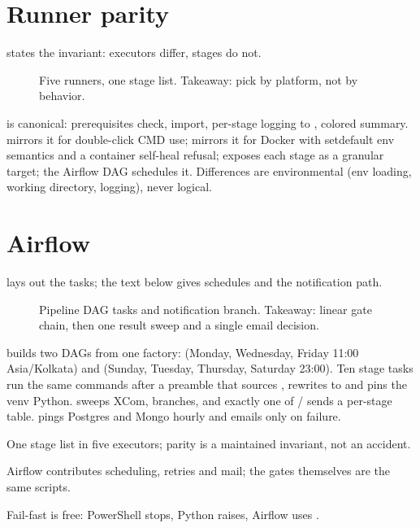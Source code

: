 \section{Runner parity}

 states the invariant: executors differ, stages do not.

\begin{figure}[tbp]
\centering

\caption{Five runners, one stage list. Takeaway: pick by platform, not by behavior.}
\label{fig:runner-parity}
\end{figure}

 is canonical: prerequisites check,  import, per-stage logging to , colored summary.  mirrors it for double-click CMD use;  mirrors it for Docker with setdefault env semantics and a container self-heal refusal;  exposes each stage as a granular target; the Airflow DAG schedules it. Differences are environmental (env loading, working directory, logging), never logical.

\section{Airflow}

 lays out the tasks; the text below gives schedules and the notification path.

\begin{figure}[tbp]
\centering

\caption{Pipeline DAG tasks and notification branch. Takeaway: linear gate chain, then one result sweep and a single email decision.}
\label{fig:airflow-dag}
\end{figure}

 builds two DAGs from one factory:  (Monday, Wednesday, Friday 11:00 Asia/Kolkata) and  (Sunday, Tuesday, Thursday, Saturday 23:00). Ten stage tasks run the same  commands after a preamble that sources , rewrites  to  and pins the venv Python.  sweeps XCom,  branches, and exactly one of / sends a per-stage table.  pings Postgres and Mongo hourly and emails only on failure.

\begin{keybox}
\item One stage list in five executors; parity is a maintained invariant, not an accident.
\item Airflow contributes scheduling, retries and mail; the gates themselves are the same scripts.
\item Fail-fast is free: PowerShell stops, Python raises, Airflow uses .
\end{keybox}
